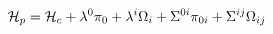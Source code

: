 \begin{equation}
\label{pri-H} {\cal H}_p={\cal H}_c + \lambda^0 \pi_0 + \lambda^i
\Omega_i +\Sigma^{0i}\pi_{0i}+\Sigma^{ij}\Omega_{ij}
\end{equation}

